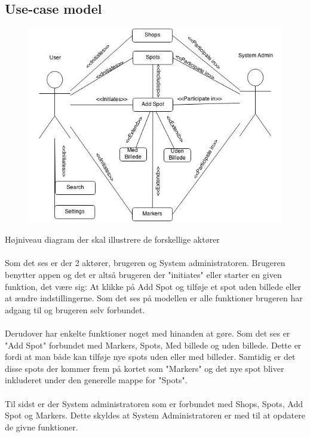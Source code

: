 \documentclass[12pt]{article}
\begin{document}
\subsection*{Use-case model}
\begin{figure}[htb]
\includegraphics[scale = 0.8]{UM.jpg}
\end{figure}

Højniveau diagram der skal illustrere de forskellige aktører\\\\
\newpage
\noindent Som det ses er der 2 aktører, brugeren og System administratoren. Brugeren benytter appen og det er altså brugeren der "initiates" eller starter en given funktion, det være sig: At klikke på Add Spot og tilføje et spot uden billede eller at ændre indstillingerne. Som det ses på modellen er alle funktioner brugeren har adgang til og brugeren selv forbundet.\\\\ Derudover har enkelte funktioner noget med hinanden at gøre. Som det ses er "Add Spot" forbundet med Markers, Spots, Med billede og uden billede. Dette er fordi at man både kan tilføje nye spots uden eller med billeder. Samtidig er det disse spots der kommer frem på kortet som "Markers" og det nye spot bliver inkluderet under den generelle mappe for "Spots".\\\\
Til sidst er der System administratoren som er forbundet med Shops, Spots, Add Spot og Markers. Dette skyldes at System Administratoren er med til at opdatere de givne funktioner.
\end{document}
